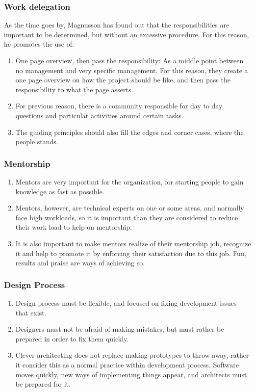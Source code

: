 \documentclass[11pt]{article}
\begin{document}
\subsubsection{Work delegation}
As the time goes by, Magnusson has found out that the responsibilities are important to be determined, but without an excessive procedure.
For this reason, he promotes the use of:
\begin{enumerate}\itemsep0pt
\item{One page overview, then pass the responsibility: As a middle point between no management and very specific management. For this reason, they create a one page overview on how the project should be like, and then pass the responsibility to what the page asserts.}
\item{For previous reason, there is a community responsible for day to day questions and particular activities around certain tasks.}
\item{The guiding principles should also fill the edges and corner cases, where the people stands.}
\end{enumerate}

\subsubsection{Mentorship}
\begin{enumerate}\itemsep0pt
\item{Mentors are very important for the organization, for starting people to gain knowledge as fast as possible.}
\item{Mentors, however, are technical experts on one or some areas, and normally face high workloads, so it is important than they are considered to reduce their work load to help on mentorship.}
\item{It is also important to make mentors realize of their mentorship job, recognize it and help to promote it by enforcing their satisfaction due to this job. Fun, results and praise are ways of achieving so.}
\end{enumerate}
  
\subsubsection{Design Process}
\begin{enumerate}\itemsep0pt
\item{Design process must be flexible, and focused on fixing development issues that exist.}
\item{Designers must not be afraid of making mistakes, but must rather be prepared in order to fix them quickly.}
\item{Clever architecting does not replace making prototypes to throw away, rather it consider this as a normal practice within development process. Software moves quickly, new ways of implementing things appear, and architects must be prepared for it.}
\end{enumerate}
\end{document}
